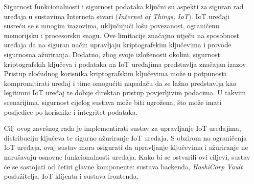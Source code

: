 \documentclass[zavrsnirad]{fer}
\begin{document}
	Sigurnost funkcionalnosti i sigurnost podataka ključni su aspekti za siguran rad uređaja u sustavima Interneta stvari (\textit{Internet of Things, IoT}). IoT uređaji susreću se s mnogim izazovima, uključujući lošu povezanost, ograničenu memorijsku i procesorsku snagu. Ove limitacije značajno utječu na sposobnost uređaja da na siguran način upravljaju kriptografskim ključevima i provode sigurnosna ažuriranja. Dodatno, zbog svoje izloženosti okolini, sigurnost kriptografskih ključeva i podataka na IoT uređajima predstavlja značajan izazov.
	Pristup zloćudnog korisnika kriptografskim ključevima može u potpunosti kompromitirati uređaj i time omogućiti napadaču da se lažno predstavlja kao legitimni IoT uređaj te dobije direktan pristup povjerljivim podacima. U takvim scenarijima, sigurnost cijelog sustava može biti ugrožena, što može imati posljedice po korisnike i integritet podataka.
	
	Cilj ovog završnog rada je implementirati sustav za upravljanje IoT uređajima, distribuciju ključeva te sigurno ažuriranje IoT uređaja. S obzirom na ograničenja IoT uređaja, ovaj sustav mora osigurati da upravljanje ključevima i ažuriranje ne narušavaju osnovne funkcionalnosti uređaja. Kako bi se ostvarili ovi ciljevi, sustav će se sastojati od četiri glavne komponente: sustava backenda, \textit{HashiCorp Vault} poslužitelja, IoT klijenta i sustava frontenda.
	
\end{document}
